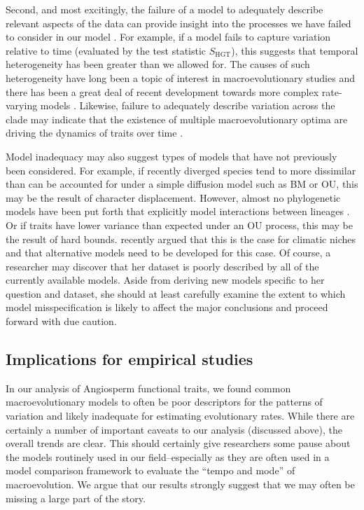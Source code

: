 Second, and most excitingly, the failure of a model to adequately describe relevant aspects of the data can provide insight into the processes we have failed to consider in our model \citep{Gelman2012}. For example, if a model fails to capture variation relative to time (evaluated by the test statistic $S_{\text{HGT}}$), this suggests that temporal heterogeneity has been greater than we allowed for. The causes of such heterogeneity have long been a topic of interest in macroevolutionary studies \citep[e.g.,][]{Simpson1944, Foote1997} and there has been a great deal of recent development towards more complex rate-varying models \citep[e.g.,][]{Omeara2006, Thomas2006, Eastman2011, Weir2012, RaboskyBAMM}. Likewise, failure to adequately describe variation across the clade may indicate that the existence of multiple macroevolutionary optima \citep[sensu][]{Hansen2012book} are driving the dynamics of traits over time \citep[see][for models that have been used to capture these dynamics]{Hansen1997, ButlerKing2004, Beaulieu2012, IngramMahler2013, UyedaBayou}. 

Model inadequacy may also suggest types of models that have not previously been considered. For example, if recently diverged species tend to more dissimilar than can be accounted for under a simple diffusion model such as BM or OU, this may be the result of character displacement. However, almost no phylogenetic models have been put forth that explicitly model interactions between lineages \citep[but see][]{NuismerHarmon}. Or if traits have lower variance than expected under an OU process, this may be the result of hard bounds. \citet{Davies2014} recently argued that this is the case for climatic niches and that alternative models need to be developed for this case. Of course, a researcher may discover that her dataset is poorly described by all of the currently available models. Aside from deriving new models specific to her question and dataset, she should at least carefully examine the extent to which model misspecification is likely to affect the major conclusions and proceed forward with due caution.
 
\subsection{Implications for empirical studies}

In our analysis of Angiosperm functional traits, we found common macroevolutionary models to often be poor descriptors for the patterns of variation and likely inadequate for estimating evolutionary rates. While there are certainly a number of important caveats to our analysis (discussed above), the overall trends are clear. This should certainly give researchers some pause about the models routinely used in our field--especially as they are often used in a model comparison framework to evaluate the ``tempo and mode'' of macroevolution. We argue that our results strongly suggest that we may often be missing a large part of the story.

